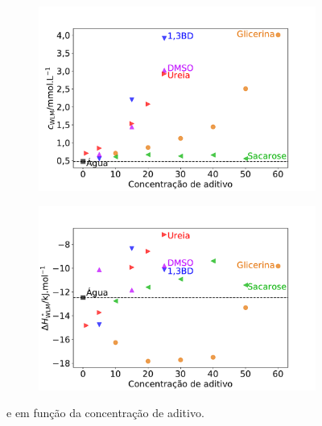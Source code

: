 			\begin{figure}[h]
				\begin{subfigure}[t]{0.5\textwidth}
					\centering
					\includegraphics[width=\textwidth]{imagens/itc/Cwlm_por_conc}
					\caption{\cwlm}
					\label{fig:cwlm_por_conc}
				\end{subfigure} %
				\begin{subfigure}[t]{0.5\textwidth}
					\centering
					\includegraphics[width=\textwidth]{imagens/itc/DHwlm_por_conc}
					\caption{\DHwlm}
					\label{fig:dhwlm_por_conc}
				\end{subfigure}
				
				\caption{\cmc{} e \DHwlm{} em função da concentração de aditivo.}
				\label{fig:cwlm_dhwlm_por_conc}
			\end{figure}


		\FloatBarrier
		
